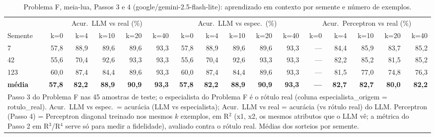 \begin{table}[htbp]
\centering
\footnotesize
\caption{Problema F, meia-lua, Passos 3 e 4 (google/gemini-2.5-flash-lite): aprendizado em contexto por semente e número de exemplos.}
\label{tab:bloco2_F_passo3_k_flashlite}
\begin{tabular}{lrrrrrrrrrrrrrrr}
\toprule
 & \multicolumn{5}{c}{Acur.\ LLM vs real (\%)} & \multicolumn{5}{c}{Acur.\ LLM vs espec.\ (\%)} & \multicolumn{5}{c}{Acur.\ Perceptron vs real (\%)} \\ \cmidrule(lr){2-6} \cmidrule(lr){7-11} \cmidrule(lr){12-16}
Semente & k=0 & k=4 & k=10 & k=20 & k=40 & k=0 & k=4 & k=10 & k=20 & k=40 & k=0 & k=4 & k=10 & k=20 & k=40 \\
\midrule
7 & 57,8 & 88,9 & 89,6 & 89,6 & 93,3 & 57,8 & 88,9 & 89,6 & 89,6 & 93,3 & — & 84,4 & 85,9 & 83,7 & 85,2 \\
42 & 55,6 & 70,4 & 92,6 & 93,3 & 93,3 & 55,6 & 70,4 & 92,6 & 93,3 & 93,3 & — & 82,2 & 85,2 & 81,5 & 85,2 \\
123 & 60,0 & 87,4 & 84,4 & 89,6 & 93,3 & 60,0 & 87,4 & 84,4 & 89,6 & 93,3 & — & 81,5 & 77,0 & 74,8 & 76,3 \\
\midrule
\textbf{média} & \textbf{57,8} & \textbf{82,2} & \textbf{88,9} & \textbf{90,9} & \textbf{93,3} & \textbf{57,8} & \textbf{82,2} & \textbf{88,9} & \textbf{90,9} & \textbf{93,3} & \textbf{—} & \textbf{82,7} & \textbf{82,7} & \textbf{80,0} & \textbf{82,2} \\
\bottomrule
\multicolumn{16}{p{0.95\linewidth}}{\footnotesize Passo 3 do Problema F nas 45 amostras de teste; o especialista do Problema F é o rótulo real (coluna especialista\_origem = rotulo\_real). Acur.\ LLM vs espec.\ = acurácia (LLM vs especialista); Acur.\ LLM vs real = acurácia (vs rótulo real) do LLM. Perceptron (Passo 4) = Perceptron diagonal treinado nos mesmos $k$ exemplos, em R$^2$ (x1, x2, os mesmos atributos que o LLM vê; a métrica do Passo 2 em R$^3$/R$^4$ serve só para medir a fidelidade), avaliado contra o rótulo real. Médias dos sorteios por semente.} \\
\end{tabular}
\end{table}
